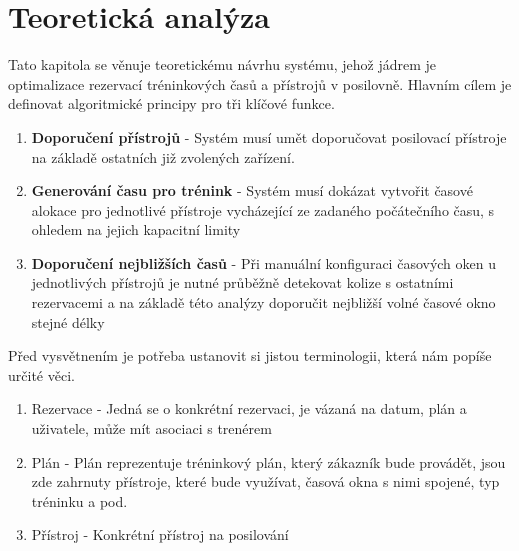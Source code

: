 \chapter{Teoretická analýza}
Tato kapitola se věnuje teoretickému návrhu systému, jehož jádrem je optimalizace rezervací tréninkových časů a přístrojů v posilovně. Hlavním cílem je definovat algoritmické principy pro tři klíčové funkce.

\begin{enumerate}
    \item \textbf{Doporučení přístrojů} - Systém musí umět doporučovat posilovací přístroje na základě ostatních již zvolených zařízení.
    \item \textbf{Generování času pro trénink} - Systém musí dokázat vytvořit časové alokace pro jednotlivé přístroje vycházející ze zadaného počátečního času, s ohledem na jejich kapacitní limity
    \item \textbf{Doporučení nejbližších časů} - Při manuální konfiguraci časových oken u jednotlivých přístrojů je nutné průběžně detekovat kolize s ostatními rezervacemi a na základě této analýzy doporučit nejbližší volné časové okno stejné délky
\end{enumerate}

Před vysvětnením je potřeba ustanovit si jistou terminologii, která nám popíše určité věci.
\begin{enumerate}
    \item Rezervace - Jedná se o konkrétní rezervaci, je vázaná na datum, plán a uživatele, může mít asociaci s trenérem
    \item Plán - Plán reprezentuje tréninkový plán, který zákazník bude provádět, jsou zde zahrnuty přístroje, které bude využívat, časová okna s nimi spojené, typ tréninku a pod.
    \item Přístroj - Konkrétní přístroj na posilování
\end{enumerate}

